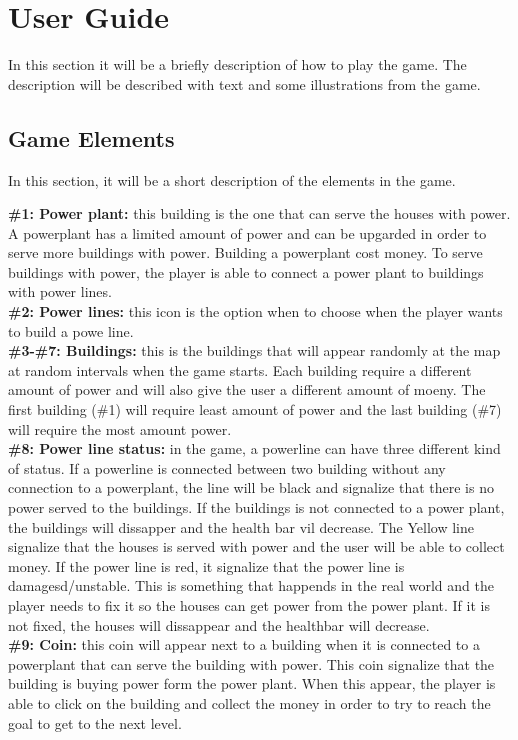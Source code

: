 \chapter{User Guide}

In this section it will be a briefly description of how to play the game.
The description will be described with text and some illustrations from the
game. 

\clearpage

\section*{Game Elements}
	In this section, it will be a short description of the elements in the game.

	{\bf \#1: Power plant:} this building is the one that can serve the houses
	with power. A powerplant has a limited amount of power and can be upgarded
	in order to serve more buildings with power. Building a powerplant cost money.
	To serve buildings with power, the player is able to connect a power plant to
	buildings with power lines. \\
	{\bf \#2: Power lines: } this icon is the option when to choose when the player
	wants to build a powe line. \\
	{\bf \#3-\#7: Buildings: } this is the buildings that will appear randomly at the
	map at random intervals when the game starts. Each building require a different 
	amount of power and will also give the user a different amount of moeny. 
	The first building (\#1) will require least amount of power and the last building
	(\#7) will require the most amount power. \\
	{\bf \#8: Power line status:} in the game, a powerline can have three different kind
	of status. If a powerline is connected between two building without any connection
	to a powerplant, the line will be black and signalize that there is no power served
	to the buildings. If the buildings is not connected to a power plant, the buildings
	will dissapper and the health bar vil decrease. The Yellow line signalize that the
	houses is served with power and the user will be able to collect money. If the 
	power line is red, it signalize that the power line is damagesd/unstable. This is
	something that happends in the real world and the player needs to fix it so the
	houses can get power from the power plant. If it is not fixed, the houses will 
	dissappear and the healthbar will decrease. \\ 
	{\bf \#9: Coin: } this coin will appear next to a building when it is connected to
	a powerplant that can serve the building with power. This coin signalize that
	the building is buying power form the power plant. When this appear, the player
	is able to click on the building and collect the money in order to try to 
	reach the goal to get to the next level. 

